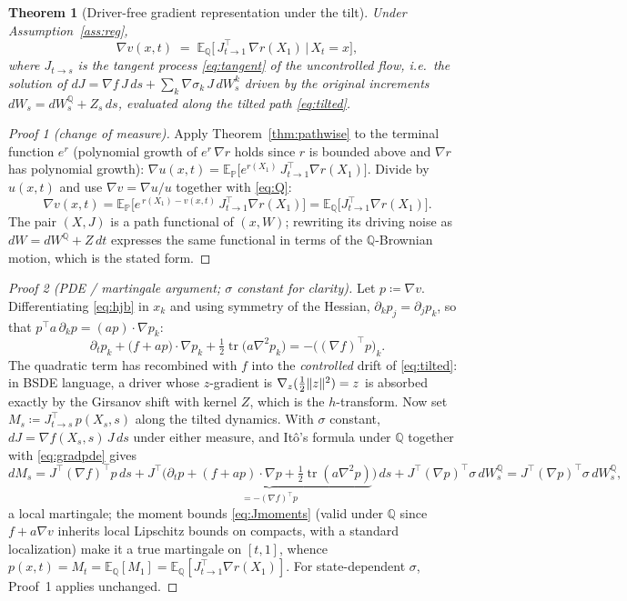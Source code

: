 \documentclass[11pt]{article}
\newtheorem{theorem}{Theorem}[section]
\theoremstyle{definition}
\theoremstyle{remark}
\newcommand{\E}{\mathbb{E}}
\newcommand{\Q}{\mathbb{Q}}
\newcommand{\Pmeas}{\mathbb{P}}
\newcommand{\tr}{\operatorname{tr}}
\newcommand{\grad}{\nabla}
\DeclarePairedDelimiter{\norm}{\lVert}{\rVert}
\begin{document}
\begin{theorem}[Driver-free gradient representation under the tilt]\label{thm:tiltgrad}
Under Assumption~\ref{ass:reg},
\begin{equation}\label{eq:tiltgradrep}
\grad v(x,t) \;=\; \E_{\Q}\big[\, J_{t\to1}^\top\, \grad r(X_1)\,\big|\, X_t = x\big],
\end{equation}
where $J_{t\to s}$ is the tangent process \eqref{eq:tangent} of the \emph{uncontrolled} flow,
i.e.\ the solution of
$dJ = \grad f\,J\,ds + \sum_k \grad\sigma_k\,J\,dW^k_s$
driven by the original increments $dW_s = dW^\Q_s + Z_s\,ds$, evaluated along the tilted path
\eqref{eq:tilted}.
\end{theorem}

\begin{proof}[Proof 1 (change of measure)]
Apply Theorem~\ref{thm:pathwise} to the terminal function $e^{r}$ (polynomial growth of
$e^r\,\grad r$ holds since $r$ is bounded above and $\grad r$ has polynomial growth):
$\grad u(x,t) = \E_\Pmeas\big[e^{r(X_1)}\,J_{t\to1}^\top \grad r(X_1)\big]$. Divide by
$u(x,t)$ and use $\grad v = \grad u / u$ together with \eqref{eq:Q}:
\[
\grad v(x,t)
= \E_\Pmeas\Big[e^{\,r(X_1)-v(x,t)}\,J_{t\to1}^\top\grad r(X_1)\Big]
= \E_\Q\big[J_{t\to1}^\top \grad r(X_1)\big].
\]
The pair $(X,J)$ is a path functional of $(x, W)$; rewriting its driving noise as
$dW = dW^\Q + Z\,dt$ expresses the same functional in terms of the $\Q$-Brownian motion,
which is the stated form.
\end{proof}

\begin{proof}[Proof 2 (PDE / martingale argument; $\sigma$ constant for clarity)]
Let $p \coloneqq \grad v$. Differentiating \eqref{eq:hjb} in $x_k$ and using symmetry of the
Hessian, $\partial_k p_j = \partial_j p_k$, so that
$p^\top a\,\partial_k p = (a p)\cdot \grad p_k$:
\begin{equation}\label{eq:gradpde}
\partial_t p_k + \big(f + a p\big)\cdot \grad p_k + \tfrac12\tr\big(a\grad^2 p_k\big)
= -\big((\grad f)^\top p\big)_k .
\end{equation}
The quadratic term has recombined with $f$ into the \emph{controlled} drift of
\eqref{eq:tilted}: in BSDE language, a driver whose $z$-gradient is
$\grad_z(\tfrac12\norm{z}^2) = z$ is absorbed exactly by the Girsanov shift with kernel $Z$,
which is the $h$-transform. Now set $M_s \coloneqq J_{t\to s}^\top\, p(X_s,s)$ along the
tilted dynamics. With $\sigma$ constant, $dJ = \grad f(X_s,s)\,J\,ds$ under either measure,
and It\^o's formula under $\Q$ together with \eqref{eq:gradpde} gives
\[
dM_s = J^\top (\grad f)^\top p \, ds
+ J^\top\Big(\underbrace{\partial_t p + (f+ap)\cdot\grad p
+ \tfrac12\tr(a\grad^2 p)}_{=-(\grad f)^\top p}\Big)\,ds
+ J^\top (\grad p)^\top \sigma\, dW^\Q_s
= J^\top (\grad p)^\top\sigma\,dW^\Q_s,
\]
a local martingale; the moment bounds \eqref{eq:Jmoments} (valid under $\Q$ since
$f + a\grad v$ inherits local Lipschitz bounds on compacts, with a standard localization)
make it a true martingale on $[t,1]$, whence
$p(x,t) = M_t = \E_\Q[M_1] = \E_\Q[J_{t\to1}^\top \grad r(X_1)]$. For state-dependent
$\sigma$, Proof~1 applies unchanged.
\end{proof}
\end{document}
